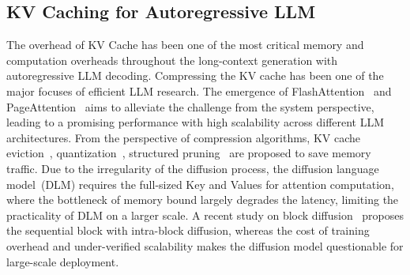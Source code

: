 \subsection{KV Caching for Autoregressive LLM}
The overhead of KV Cache has been one of the most critical memory and computation overheads throughout the long-context generation with autoregressive LLM decoding. 
Compressing the KV cache has been one of the major focuses of efficient LLM research. 
The emergence of FlashAttention~\cite{dao2022flashattention, dao2023flashattention, shah2024flashattention} and PageAttention~\cite{kwon2023efficient} aims to alleviate the challenge from the system perspective, leading to a promising performance with high scalability across different LLM architectures. 
From the perspective of compression algorithms, KV cache eviction~\cite{yang2024pyramidinfer, cai2024pyramidkv}, quantization~\cite{liu2024kivi, hooper2024kvquant}, structured pruning~\cite{lu2024not, xu2025think} are proposed to save memory traffic. 
Due to the irregularity of the diffusion process, the diffusion language model~(DLM) requires the full-sized Key and Values for attention computation, where the bottleneck of memory bound largely degrades the latency, limiting the practicality of DLM on a larger scale. 
A recent study on block diffusion~\cite{arriola2025block} proposes the sequential block with intra-block diffusion, whereas the cost of training overhead and under-verified scalability makes the diffusion model questionable for large-scale deployment. 


